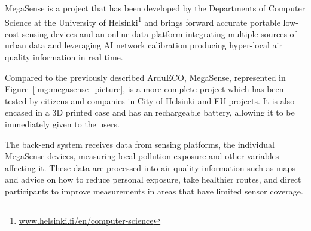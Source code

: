 	
		
			MegaSense is a project that has been developed by the Departments of Computer Science at the University of Helsinki\footnote{ \url{www.helsinki.fi/en/computer-science}} and brings forward accurate portable low-cost sensing devices and an online data platform integrating multiple sources of urban data and leveraging AI network calibration producing hyper-local air quality information in real time.
				
			Compared to the previously described ArduECO, MegaSense, represented in Figure~\ref{img:megasense_picture}, is a more complete project which has been tested by citizens and companies in City of Helsinki and EU projects.
			It is also encased in a $3$D printed case and has an rechargeable battery, allowing it to be immediately given to the users.

			The back-end system receives data from sensing platforms, the individual MegaSense devices, measuring local pollution exposure and other variables affecting it.
			These data are processed into air quality information such as maps and advice on how to reduce personal exposure, take healthier routes, and direct participants to improve measurements in areas that have limited sensor coverage.
			
